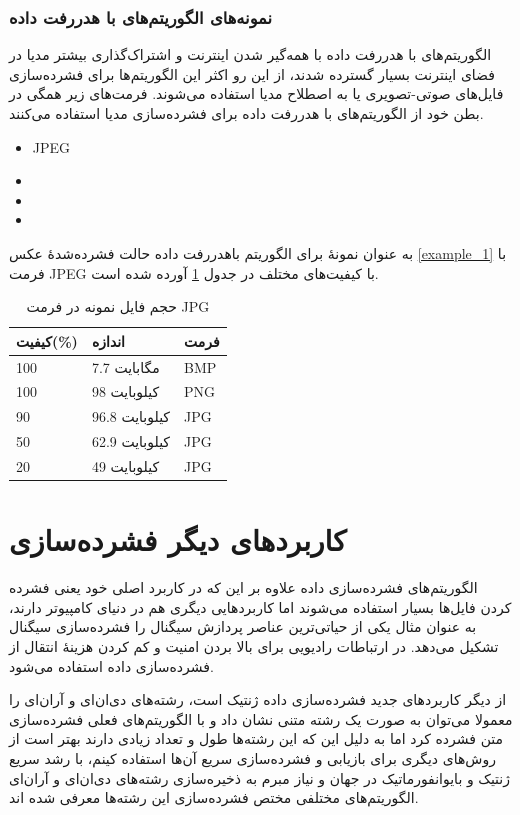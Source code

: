 \subsubsection{نمونه‌های الگوریتم‌های با هدررفت داده}
الگوریتم‌های با هدررفت داده با همه‌گیر شدن اینترنت و اشتراک‌گذاری 
بیشتر مدیا در فضای اینترنت بسیار گسترده شدند، از این رو اکثر این الگوریتم‌ها برای فشرده‌سازی فایل‌های صوتی-تصویری یا به اصطلاح 
مدیا
استفاده می‌شوند. فرمت‌های زیر همگی در بطن خود از الگوریتم‌های با هدررفت داده برای فشرده‌سازی مدیا استفاده می‌کنند.

\begin{itemize}
	\item JPEG
	\item {}
	\item {}
	\item {}
\end{itemize}
به عنوان نمونهٔ برای الگوریتم باهدررفت داده 
حالت فشرده‌شدهٔ عکس 
\ref{example_1}
با فرمت JPEG 
با کیفیت‌های مختلف در جدول 
\ref{compare_2}
آورده شده است.

\begin{table}[h]
	\centering
	\caption{حجم فایل نمونه در فرمت JPG}
	\label{compare_2}
	\begin{tabular}{@{}lll@{}}
	\toprule
	کیفیت(\%) & اندازه & فرمت \\ \midrule
	100 & 7.7 مگابایت & BMP \\
	100 & 98 کیلوبایت & PNG \\
	90 & 96.8 کیلوبایت & JPG \\
	50 & 62.9 کیلوبایت & JPG \\
	20 & 49  کیلوبایت& JPG \\ \bottomrule
	\end{tabular}
	\end{table}


\section{کاربردهای دیگر فشرده‌سازی}
الگوریتم‌های فشرده‌سازی داده علاوه بر این که در کاربرد اصلی خود یعنی فشرده کردن فایل‌ها بسیار استفاده می‌شوند اما کاربردهایی دیگری هم در دنیای
کامپیوتر دارند، به عنوان مثال یکی از حیاتی‌ترین عناصر پردازش سیگنال 
را فشرده‌سازی سیگنال تشکیل می‌دهد. در ارتباطات رادیویی برای بالا بردن امنیت و کم کردن هزینهٔ انتقال از فشرده‌سازی داده استفاده می‌شود. 

از دیگر کاربردهای جدید فشرده‌سازی داده ژنتیک است، رشته‌های دی‌ان‌ای
و آر‌ان‌ای
 را معمولا می‌توان به صورت
یک رشته متنی نشان داد و با الگوریتم‌های فعلی فشرده‌سازی متن فشرده کرد اما به دلیل این که این رشته‌ها طول و تعداد زیادی دارند
بهتر است از روش‌های دیگری برای بازیابی و فشرده‌سازی سریع آن‌ها استفاده کینم، با رشد سریع ژنتیک و بایوانفورماتیک در جهان و نیاز
مبرم به ذخیره‌سازی رشته‌های دی‌ان‌ای و آران‌ای 
الگوریتم‌های مختلفی مختص فشرده‌سازی این رشته‌ها معرفی شده اند\cite{dna}. 